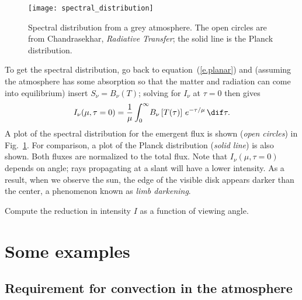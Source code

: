 \begin{figure}[htbp]
\texttt{[image: spectral\_distribution]}
\caption[Spectral distribution from a grey atmosphere.]{\label{f.spectral} Spectral distribution from a grey atmosphere. The open circles are from Chandrasekhar, \emph{Radiative Transfer}; the solid line is the Planck distribution.}
\end{figure}

To get the spectral distribution, go back to equation~(\ref{e.planar}) and (assuming the atmosphere has some absorption so that the matter and radiation can come into equilibrium) insert $S_{\nu} = B_{\nu}(T)$; solving for $I_{\nu}$ at $\tau = 0$ then gives
\begin{equation}\label{e.spectral}
I_{\nu}(\mu,\tau=0) = \frac{1}{\mu}\int_{0}^{\infty}\!B_{\nu}\left[T(\tau)\right] \, e^{-\tau/\mu}\,\dif\tau.
\end{equation}
A plot of the spectral distribution for the emergent flux is shown (\emph{open circles}) in Fig.~\ref{f.spectral}. For comparison, a plot of the Planck distribution (\emph{solid line}) is also shown. Both fluxes are normalized to the total flux.  Note that $I_{\nu}(\mu,\tau=0)$ depends on angle; rays propagating at a slant will have a lower intensity.  As a result, when we observe the sun, the edge of the visible disk appears darker than the center, a phenomenon known as \emph{limb darkening}.

\begin{exercisebox}
Compute the reduction in intensity $I$ as a function of viewing angle.
\end{exercisebox}

\section{Some examples}

\subsection{Requirement for convection in the atmosphere}\label{s.atmosphere-convection}

